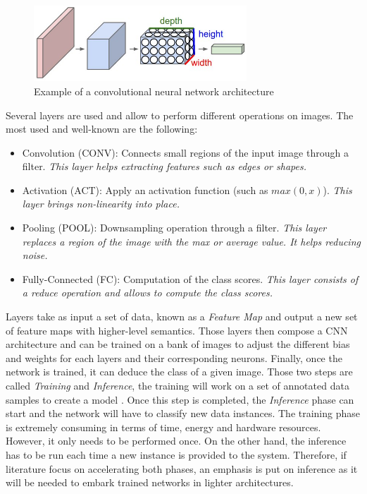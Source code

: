 \begin{figure}[htbp]
	\centering
		\includegraphics[width=8cm]{Figures/CNN.png}
	\caption[Convolutional Neural Network Example]{Example of a convolutional neural network architecture \cite{Karpathy2015}}
	\label{fig:CNN}
\end{figure}

Several layers are used and allow to perform different operations on images. The most used and well-known are the following:
\begin{itemize}
  \item Convolution   (CONV): Connects small regions of the input image through a filter. \emph{This layer helps extracting features such as edges or shapes.}
  \item Activation     (ACT): Apply an activation function (such as $max(0,x)$). \emph{This layer brings non-linearity into place.}
  \item Pooling       (POOL): Downsampling operation through a filter. \emph{This layer replaces a region of the image with the max or average value. It helps reducing noise.}
  \item Fully-Connected (FC): Computation of the class scores. \emph{This layer consists of a reduce operation and allows to compute the class scores.}
\end{itemize}

Layers take as input a set of data, known as a \emph{Feature Map} and output a new set of feature maps with higher-level semantics. Those layers then compose a CNN architecture and can be trained on a bank of images to adjust the different bias and weights for each layers and their corresponding neurons. Finally, once the network is trained, it can deduce the class of a given image. Those two steps are called \emph{Training} and \emph{Inference}, the training will work on a set of annotated data samples to create a model  \cite{Abdelouahab2018}. Once this step is completed, the \emph{Inference} phase can start and the network will have to classify new data instances. The training phase is extremely consuming in terms of time, energy and hardware resources. However, it only needs to be performed once. On the other hand, the inference has to be run each time a new instance is provided to the system. Therefore, if literature focus on accelerating both phases, an emphasis is put on inference as it will be needed to embark trained networks in lighter architectures.

